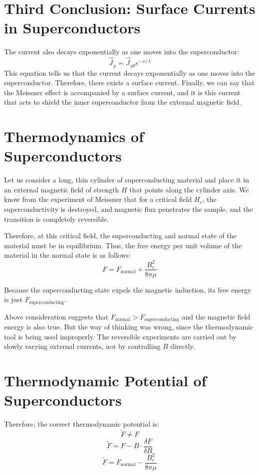 \documentclass{article}
\begin{document}
\section{Third Conclusion: Surface Currents in Superconductors}

The current also decays exponentially as one moves into the superconductor:
\[
\vec{J}_y = \vec{J}_{y0} e^{-x/\lambda}
\]
This equation tells us that the current decays exponentially as one moves into the superconductor. Therefore, there exists a surface current. Finally, we can say that the Meissner effect is accompanied by a surface current, and it is this current that acts to shield the inner superconductor from the external magnetic field.

\section{Thermodynamics of Superconductors}

Let us consider a long, thin cylinder of superconducting material and place it in an external magnetic field of strength \(H\) that points along the cylinder axis. We know from the experiment of Meissner that for a critical field \(H_c\), the superconductivity is destroyed, and magnetic flux penetrates the sample, and the transition is completely reversible.

Therefore, at this critical field, the superconducting and normal state of the material must be in equilibrium. Thus, the free energy per unit volume of the material in the normal state is as follows:
\[
F = F_{\text{normal}} + \frac{B_c^2}{8 \pi \mu} \tag{15}
\]

Because the superconducting state expels the magnetic induction, its free energy is just \(F_{\text{superconducting}}\).

Above consideration suggests that \(F_{\text{normal}} > F_{\text{superconducting}}\) and the magnetic field energy is also true. But the way of thinking was wrong, since the thermodynamic tool is being used improperly. The reversible experiments are carried out by slowly varying external currents, not by controlling \(B\) directly.

\section{Thermodynamic Potential of Superconductors}

Therefore, the correct thermodynamic potential is:
\[
\tilde{F} \neq F
\]
\[
\tilde{F} = F - B \cdot \frac{\delta F}{\delta B}
\]
\[
\tilde{F} = F_{\text{normal}} - \frac{B_c^2}{8 \pi \mu} \tag{16}
\]
\end{document}
